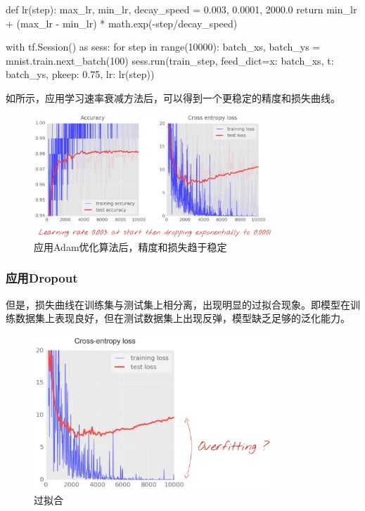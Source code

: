 \begin{content}
\begin{leftbar}
\begin{python}
def lr(step):
  max_lr, min_lr, decay_speed = 0.003, 0.0001, 2000.0
  return min_lr + (max_lr - min_lr) * math.exp(-step/decay_speed)

with tf.Session() as sess:
  for step in range(10000):
    batch_xs, batch_ys = mnist.train.next_batch(100)
    sess.run(train_step, 
      feed_dict={x: batch_xs, t: batch_ys, pkeep: 0.75, lr: lr(step)})
\end{python}
\end{leftbar}

如所示，应用学习速率衰减方法后，可以得到一个更稳定的精度和损失曲线。

\begin{figure}[H]
\centering
\includegraphics[width=0.8\textwidth]{figures/mnist-apply-learning-rate-decay.png}
\caption{应用Adam优化算法后，精度和损失趋于稳定}
 \label{fig:mnist-apply-learning-rate-decay}
\end{figure}

\subsubsection{应用Dropout}

但是，损失曲线在训练集与测试集上相分离，出现明显的过拟合现象。即模型在训练数据集上表现良好，但在测试数据集上出现反弹，模型缺乏足够的泛化能力。

\begin{figure}[H]
\centering
\includegraphics[width=0.8\textwidth]{figures/mnist-overfitting.png}
\caption{过拟合}
 \label{fig:mnist-overfitting}
\end{figure}


\end{content}
